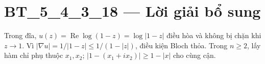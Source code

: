 \documentclass[10pt,a4paper]{article}
\begin{document}
\section*{BT\_5\_4\_3\_18 — Lời giải bổ sung}
Trong đĩa, $u(z)=\operatorname{Re}\log(1-z)=\log|1-z|$ điều hòa và không bị chặn khi $z\to1$. Vì $|\nabla u|=1/|1-z|\le1/(1-|z|)$, điều kiện Bloch thỏa. Trong $n\ge2$, lấy hàm chỉ phụ thuộc $x_1,x_2$; $|1-(x_1+ix_2)|\ge1-|x|$ cho cùng cận.
\end{document}
